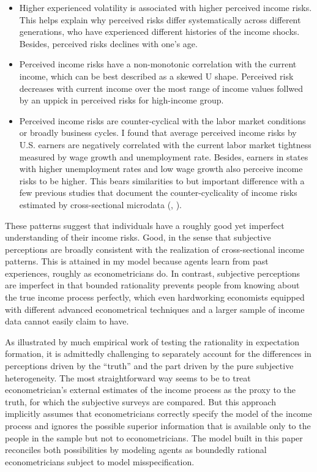 \documentclass[12pt,notitlepage,onecolumn,aps,pra]{article}
\begin{document}
\begin{itemize}
\item
  Higher experienced volatility is associated with higher perceived
  income risks. This helps explain why perceived risks differ
  systematically across different generations, who have experienced
  different histories of the income shocks. Besides, perceived risks
  declines with one's age.
\item
  Perceived income risks have a non-monotonic correlation with the
  current income, which can be best described as a skewed U shape.
  Perceived risk decreases with current income over the most range of
  income values follwed by an uppick in perceived risks for high-income
  group.
\item
  Perceived income risks are counter-cyclical with the labor market
  conditions or broadly business cycles. I found that average perceived
  income risks by U.S. earners are negatively correlated with the
  current labor market tightness measured by wage growth and
  unemployment rate. Besides, earners in states with higher unemployment
  rates and low wage growth also perceive income risks to be higher.
  This bears similarities to but important difference with a few
  previous studies that document the counter-cyclicality of income risks
  estimated by cross-sectional microdata (\cite{guvenen2014nature},
  \cite{catherine_countercyclical_2019}).
\end{itemize}

These patterns suggest that individuals have a roughly good yet
imperfect understanding of their income risks. Good, in the sense that
subjective perceptions are broadly consistent with the realization of
cross-sectional income patterns. This is attained in my model because
agents learn from past experiences, roughly as econometricians do. In
contrast, subjective perceptions are imperfect in that bounded
rationality prevents people from knowing about the true income process
perfectly, which even hardworking economists equipped with different
advanced econometrical techniques and a larger sample of income data
cannot easily claim to have.

As illustrated by much empirical work of testing the rationality in
expectation formation, it is admittedly challenging to separately
account for the differences in perceptions driven by the ``truth'' and
the part driven by the pure subjective heterogeneity. The most
straightforward way seems to be to treat econometrician's external
estimates of the income process as the proxy to the truth, for which the
subjective surveys are compared. But this approach implicitly assumes
that econometricians correctly specify the model of the income process
and ignores the possible superior information that is available only to
the people in the sample but not to econometricians. The model built in
this paper reconciles both possibilities by modeling agents as boundedly
rational econometricians subject to model misspecification.
\end{document}
